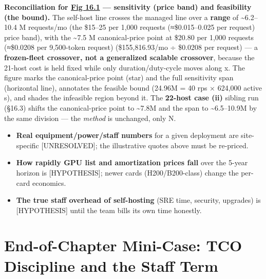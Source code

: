 \textbf{Reconciliation for \hyperref[fig:16.1]{Fig 16.1} --- sensitivity (price band) and
feasibility (the bound).} The self-host line crosses the managed line
over a \textbf{range} of \textasciitilde6.2--10.4 M requests/mo (the
\$15--25 per 1,000 requests (≈\$0.015--0.025 per request) price band),
with the \textasciitilde7.5 M canonical-price point at \$20.80 per 1,000
requests (≈\$0.0208 per 9,500-token request) (\$155,816.93/mo ÷ \$0.0208
per request) --- a \textbf{frozen-fleet crossover, not a generalized
scalable crossover}, because the 21-host cost is held fixed while only
duration/duty-cycle moves along x. The figure marks the canonical-price
point (star) and the full sensitivity span (horizontal line), annotates
the feasible bound (24.96M = 40 rps × 624,000 active s), and shades the
infeasible region beyond it. The \textbf{22-host case (ii)} sibling run
(§16.3) shifts the canonical-price point to \textasciitilde7.8M and the
span to \textasciitilde6.5--10.9M by the same division --- the
\emph{method} is unchanged, only N.

\label{what-we-still-dont-know}


\begin{itemize}
\tightlist
\item
  \textbf{Real equipment/power/staff numbers} for a given deployment are
  site-specific \mbox{{[}UNRESOLVED{]}}; the illustrative quotes above must be
  re-priced.
\item
  \textbf{How rapidly GPU list and amortization prices fall} over the
  5-year horizon is \mbox{{[}HYPOTHESIS{]}}; newer cards (H200/B200-class)
  change the per-card economics.
\item
  \textbf{The true staff overhead of self-hosting} (SRE time, security,
  upgrades) is \mbox{{[}HYPOTHESIS{]}} until the team bills its own time
  honestly.
\end{itemize}

\section{End-of-Chapter Mini-Case: TCO Discipline and the Staff
Term}\label{end-of-chapter-mini-case-tco-discipline-and-the-staff-term}

